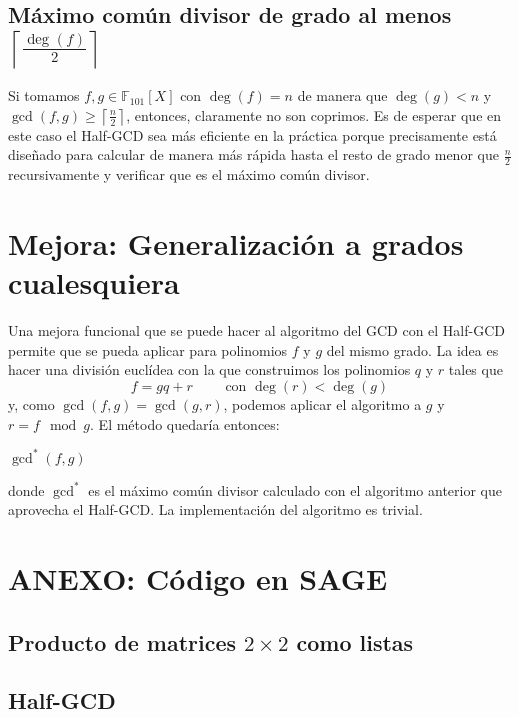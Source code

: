 \documentclass[10pt]{article}
\theoremstyle{definition}
\begin{document}
\subsection{Máximo común divisor de grado al menos $\left\lceil\frac{\deg(f)}{2}\right\rceil$}
Si tomamos $f,g\in\mathbb{F}_{101}[X]$ con $\deg(f)=n$ de manera que $\deg(g)<n$ y $\gcd(f,g)\geq \left\lceil \frac{n}{2}\right\rceil$, entonces, claramente no son coprimos. Es de esperar que en este caso el Half-GCD sea más eficiente en la práctica porque precisamente está diseñado para calcular de manera más rápida hasta el resto de grado menor que $\frac{n}{2}$ recursivamente y verificar que es el máximo común divisor.

\section{Mejora: Generalización a grados cualesquiera}
Una mejora funcional que se puede hacer al algoritmo del GCD con el Half-GCD permite que se pueda aplicar para polinomios $f$ y $g$ del mismo grado. La idea es hacer una división euclídea con la que construimos los polinomios $q$ y $r$ tales que
$$f=gq+r\qquad\text{ con }\deg(r)<\deg(g)$$
y, como $\gcd(f,g)=\gcd(g,r)$, podemos aplicar el algoritmo a $g$ y $r=f\mod g$. El método quedaría entonces:

    \begin{algorithm}[H]
    \DontPrintSemicolon
    \Return $\gcd^*(f,g)$\;
    
    \end{algorithm}
donde $\gcd^*$ es el máximo común divisor calculado con el algoritmo anterior que aprovecha el Half-GCD. La implementación del algoritmo es trivial.

\newpage
\section*{ANEXO: Código en SAGE}
\subsection*{Producto de matrices $2\times 2$ como listas}

\subsection*{Half-GCD}

\newpage
\end{document}
